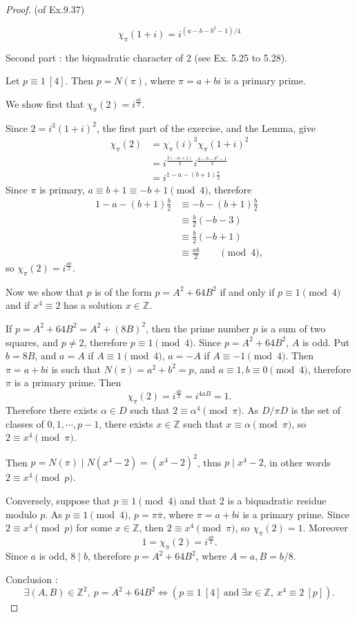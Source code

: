 \documentclass[11pt,a4paper]{article}
\newcommand{\Z}{\mathbb{Z}}
\begin{document}
\begin{proof}{(of Ex.9.37)}
\begin{enumerate}
$$\chi_\pi(1+i) = i^{(a-b-b^2-1)/4}$$

\end{enumerate}

\bigskip

Second part : the biquadratic character of 2 (see Ex. 5.25 to 5.28).

Let $p\equiv 1 \ [4]$. Then $p=N(\pi)$, where $\pi = a+bi$ is a primary prime.

We show first that $\chi_\pi(2)=i^\frac{ab}{2}$.

Since $2 = i^3(1+i)^2$, the first part of the exercise, and the Lemma, give
\begin{align*}
\chi_\pi(2) &= \chi_\pi(i)^3 \chi_\pi(1+i)^2\\
&=i^\frac{3(-a+1)}{2} i ^\frac{a-b-b^2-1}{2}\\
&=i^{1-a -(b+1)\frac{b}{2}}
\end{align*}
Since $\pi$ is primary, $a\equiv b+1 \equiv -b+1\pmod 4$, therefore
\begin{align*}
1-a -(b+1)\frac{b}{2} &\equiv - b -(b+1)\frac{b}{2}\\
&\equiv \frac{b}{2}(-b-3)\\
&\equiv \frac{b}{2}(-b+1)\\
&\equiv \frac{ab}{2} \qquad \pmod 4,
\end{align*}
so $\chi_\pi(2) = i^\frac{ab}{2} $.
 
   \bigskip
   
 Now we show that $p$ is of the form $p=A^2+64B^2$ if and only if $p\equiv 1 \pmod 4$ and if $x^4 \equiv 2$ has a solution $x \in \Z$.
 
 If $p=A^2+64B^2 = A^2 + (8B)^2$, then the prime number $p$ is a sum of two squares, and $p\ne 2$, therefore $p\equiv 1 \pmod 4$. Since $p=A^2 + 64B^2$, $A$ is odd. Put $b = 8B$, and $a = A$ if $A\equiv 1 \pmod 4$, $a = -A$ if $A\equiv -1 \pmod 4$. Then $\pi =a +bi$ is such that $N(\pi) = a^2 +b^2 = p$, and $a\equiv 1, b\equiv 0 \pmod 4$, therefore $\pi$ is a primary prime. Then
 $$\chi_\pi(2) = i^\frac{ab}{2} = i^{4aB} = 1.$$
  Therefore there exists $\alpha \in D$ such that $2\equiv \alpha^4 \pmod \pi$. As $D/\pi D$ is the set of classes of $0,1,\cdots,p-1$, there exists $x\in \Z$ such that $x\equiv \alpha \pmod \pi$, so $2 \equiv x^4 \pmod \pi$.
 
 Then $p = N(\pi) \mid N(x^4-2) = (x^4-2)^2$, thus $p \mid x^4 -2$, in other words $2\equiv x^4 \pmod p$.
   
Conversely, suppose that $p\equiv 1 \pmod 4$ and that $2$ is a biquadratic residue modulo $p$. As $p\equiv 1 \pmod 4$, $p = \pi \overline{\pi}$, where $\pi =a + bi$ is a primary prime. Since $2\equiv x^4 \pmod p$ for some $x \in \Z$, then $2 \equiv x^4 \pmod \pi$, so $\chi_\pi(2)=1$. Moreover
$$1 = \chi_\pi(2) = i^\frac{ab}{2}.$$
Since $a$ is odd, $8 \mid b$, therefore $p=A^2 + 64B^2$, where $A=a, B =b/8$.
  
 Conclusion :
 $$\exists (A,B) \in \Z^2,\ p = A^2+64B^2 \iff (p\equiv 1 \ [4] \ \mathrm{and}\ \exists x \in \Z, \ x^4 \equiv 2 \ [p]).$$
\end{proof}
\end{document}
